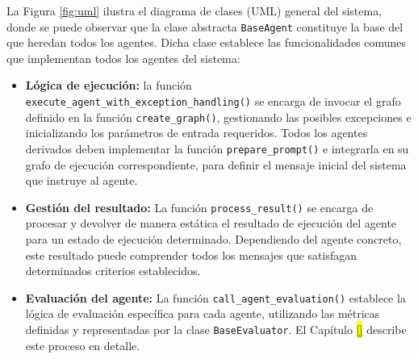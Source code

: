 La Figura \ref{fig:uml} ilustra el diagrama de clases (UML) general del sistema, donde se puede observar que la clase abstracta \texttt{BaseAgent} constituye la base del que heredan todos los agentes. Dicha clase establece las funcionalidades comunes que implementan todos los agentes del sistema:

\begin{itemize}
\item \textbf{Lógica de ejecución:} la función \texttt{execute\_agent\_with\_exception\_handling()} se encarga de invocar el grafo definido en la función \texttt{create\_graph()}, gestionando las posibles excepciones e inicializando los parámetros de entrada requeridos. Todos los agentes derivados deben implementar la función \texttt{prepare\_prompt()} e integrarla en su grafo de ejecución correspondiente, para definir el mensaje inicial del sistema que instruye al agente.
\item \textbf{Gestión del resultado:} La función \texttt{process\_result()} se encarga de procesar y devolver de manera estática el resultado de ejecución del agente para un estado de ejecución determinado. Dependiendo del agente concreto, este resultado puede comprender todos los mensajes que satisfagan determinados criterios establecidos.
\item \textbf{Evaluación del agente:} La función \texttt{call\_agent\_evaluation()} establece la lógica de evaluación específica para cada agente, utilizando las métricas definidas y representadas por la clase \texttt{BaseEvaluator}. El Capítulo \colorbox{yellow}{\ref{}} describe este proceso en detalle.
\end{itemize}

